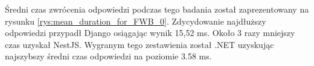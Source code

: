 Średni czas zwrócenia odpowiedzi podczas tego badania został zaprezentowany na rysunku \ref{rys:mean_duration_for_FWB_0}.
Zdycydowanie najdłuższy odpowiedzi przypadł Django osiągając wynik 15,52 ms.
Około 3 razy mniejszy czas uzyskał NestJS.
Wygranym tego zestawienia został .NET uzyskując najszybszy średni czas odpowiedzi na poziomie 3.58 ms.
